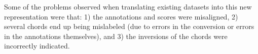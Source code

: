 
Some of the problems observed when translating existing
datasets into this new representation were that: 1) the
annotations and scores were misaligned, 2) several chords
end up being mislabeled (due to errors in the conversion or
errors in the annotations themselves), and 3) the inversions
of the chords were incorrectly indicated.
